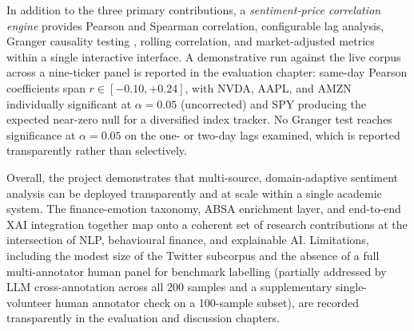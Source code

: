 In addition to the three primary contributions, a \textit{sentiment-price
correlation engine} provides Pearson and Spearman correlation, configurable lag
analysis, Granger causality testing \citep{granger1969}, rolling correlation, and
market-adjusted metrics within a single interactive interface. A demonstrative
run against the live corpus across a nine-ticker panel is reported in the
evaluation chapter: same-day Pearson coefficients span $r \in [-0.10, +0.24]$,
with NVDA, AAPL, and AMZN individually significant at $\alpha = 0.05$
(uncorrected) and SPY producing the expected near-zero null for a diversified
index tracker. No Granger test reaches significance at $\alpha = 0.05$ on the
one- or two-day lags examined, which is reported transparently rather than
selectively.

Overall, the project demonstrates that multi-source, domain-adaptive sentiment
analysis can be deployed transparently and at scale within a single academic
system. The finance-emotion taxonomy, ABSA enrichment layer, and end-to-end
XAI integration together map onto a coherent set of research contributions at
the intersection of NLP, behavioural finance, and explainable AI. Limitations,
including the modest size of the Twitter subcorpus and the absence of a
full multi-annotator human panel for benchmark labelling (partially addressed
by LLM cross-annotation across all 200 samples and a supplementary
single-volunteer human annotator check on a 100-sample subset), are recorded
transparently in the evaluation and discussion chapters.
